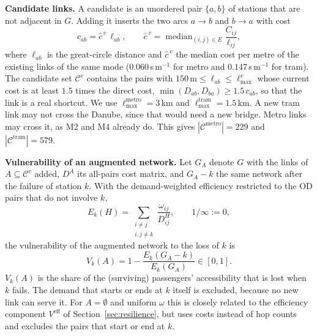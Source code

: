 \documentclass[12pt,a4paper]{article}
\theoremstyle{plain}
\theoremstyle{definition}
\theoremstyle{remark}
\begin{document}
\textbf{Candidate links.}  A candidate is an unordered pair $\{a,b\}$ of
stations that are not adjacent in $G$.  Adding it inserts the two arcs
$a\to b$ and $b\to a$ with cost
\begin{equation}
  c_{ab}=\hat c^{\,v}\,\ell_{ab},\qquad
  \hat c^{\,v}=\operatorname{median}_{(i,j)\in E}\frac{C_{ij}}{\ell_{ij}},
  \label{eq:newcost}
\end{equation}
where $\ell_{ab}$ is the great-circle distance and $\hat c^{\,v}$ the median
cost per metre of the existing links of the same mode ($0.060$\,s\,m$^{-1}$
for metro and $0.147$\,s\,m$^{-1}$ for tram).  The candidate set
$\mathcal C^v$ contains the pairs with $150\,\text{m}\le\ell_{ab}\le\ell^v_{\max}$
whose current cost is at least $1.5$ times the direct cost,
$\min(D_{ab},D_{ba})\ge1.5\,c_{ab}$, so that the link is a real shortcut.  We use
$\ell^{\mathrm{metro}}_{\max}=3$\,km and $\ell^{\mathrm{tram}}_{\max}=1.5$\,km.
A new tram link may not cross the Danube, since that would need a new bridge.
Metro links may cross it, as M2 and M4 already do.  This gives
$|\mathcal C^{\mathrm{metro}}|=229$ and $|\mathcal C^{\mathrm{tram}}|=579$.

\textbf{Vulnerability of an augmented network.}  Let $G_A$ denote $G$ with the
links of $A\subseteq\mathcal C^v$ added, $D^A$ its all-pairs cost matrix, and
$G_A-k$ the same network after the failure of station $k$.  With the
demand-weighted efficiency restricted to the OD pairs that do not involve $k$,
\begin{equation}
  E_k(H)=\sum_{\substack{i\ne j\\ i,j\ne k}}\frac{\omega_{ij}}{D^{H}_{ij}},
  \qquad 1/\infty:=0,
\end{equation}
the vulnerability of the augmented network to the loss of $k$ is
\begin{equation}
  V_k(A)=1-\frac{E_k(G_A-k)}{E_k(G_A)}\in[0,1].
  \label{eq:vk}
\end{equation}
$V_k(A)$ is the share of the (surviving) passengers' accessibility that is lost
when $k$ fails.  The demand that starts or ends at $k$ itself is excluded,
because no new link can serve it.  For $A=\emptyset$ and uniform $\omega$ this
is closely related to the efficiency component $V^{\mathrm{eff}}$ of
Section~\ref{sec:resilience}, but uses costs instead of hop counts and
excludes the pairs that start or end at $k$.
\end{document}

